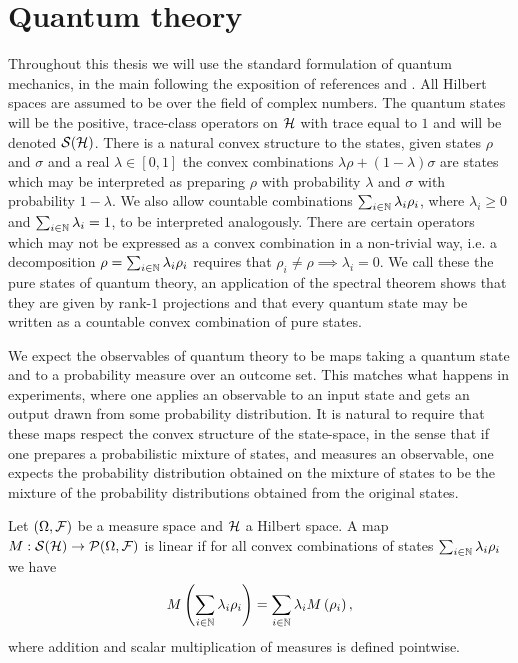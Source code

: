 \section{Quantum theory}
\label{sec:prelim-quantum}

Throughout this thesis we will use the standard formulation of quantum mechanics, in the main following the exposition of references \cite{quantum-measurement-busch-et-al} and \cite{statistical-structure-quantum-holevo}. All Hilbert spaces are assumed to be over the field of complex numbers. The quantum states will be the positive, trace-class operators on $\mathcal{H}$ with trace equal to $1$ and will be denoted $\dops[\hcal]$. There is a natural convex structure to the states, given states $\rho$ and $\sigma$ and a real $\lambda \in[0,1]$ the convex combinations $\lambda\rho + (1-\lambda)\sigma$ are states which may be interpreted as preparing $\rho$ with probability $\lambda$ and $\sigma$ with probability $1-\lambda$. We also allow countable combinations $\sum_{i\in\mathbb{N}}\lambda_i\rho_i$, where $\lambda_i \geq 0$ and $\sum_{i\in\mathbb{N}}\lambda_i = 1$, to be interpreted analogously. There are certain operators which may not be expressed as a convex combination in a non-trivial way, i.e. a decomposition $\rho = \sum_{i\in\mathbb{N}} \lambda_i\rho_i$ requires that $\rho_i\neq \rho \implies \lambda_i = 0$. We call these the pure states of quantum theory, an application of the spectral theorem shows that they are given by rank-$1$ projections and that every quantum state may be written as a countable convex combination of pure states.

We expect the observables of quantum theory to be maps taking a quantum state and to a probability measure over an outcome set. This matches what happens in experiments, where one applies an observable to an input state and gets an output drawn from some probability distribution. It is natural to require that these maps respect the convex structure of the state-space, in the sense that if one prepares a probabilistic mixture of states, and measures an observable, one expects the probability distribution obtained on the mixture of states to be the mixture of the probability distributions obtained from the original states. 
\begin{defn}\label{defn:linear-meas-map}
  Let $(\Omega,\mathcal{F})$ be a measure space and $\mathcal{H}$ a Hilbert space. A map $M:\dops[\hcal]\to\probs{\Omega}{\fcal}$ is linear if for all convex combinations of states $\sum_{i\in\mathbb{N}} \lambda_i \rho_i$ we have
  \begin{align}
    M\left(\sum_{i\in\mathbb{N}} \lambda_i \rho_i\right) = \sum_{i\in\mathbb{N}} \lambda_i M\left(\rho_i\right),
  \end{align}
  where addition and scalar multiplication of measures is defined pointwise.
\end{defn}

